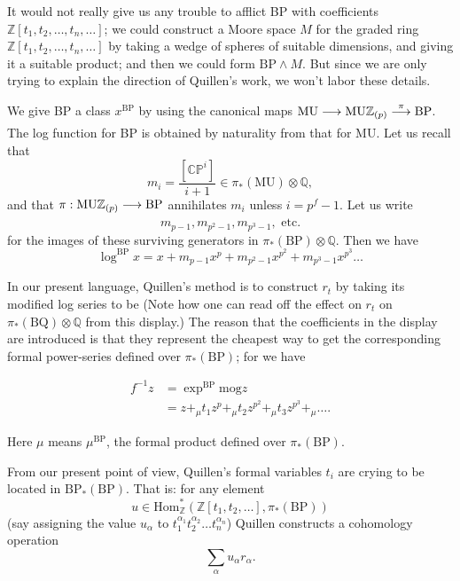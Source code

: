 \documentclass[../main]{subfiles}
\begin{document}
It would not really give us any trouble to afflict BP with coefficients $\mathbb Z[t_1, t_2, \ldots, t_n, \ldots]$; we could construct a Moore space $M$ for the graded ring $\mathbb Z[t_1, t_2, \ldots, t_n, \ldots]$ by taking a wedge of spheres of suitable dimensions, and giving it a suitable product; and then we could form $\mathrm{BP} \wedge M$. But since we are only trying to explain the direction of Quillen's work, we won't labor these details.

We give BP a class $x^{\mathrm{BP}}$ by using the canonical maps $\mathrm{MU} \lar{} \mathrm{MU} \mathbb Z_{(p)} \lar{\pi} \mathrm{BP}$. The log function for BP is obtained by naturality from that for MU. Let us recall that \[m_i = \frac {[\mathbb {CP}^i]} {i + 1} \in \pi_\ast(\mathrm{MU}) \otimes \mathbb Q,\] and that $\pi : \mathrm{MU} \mathbb Z_{(p)} \lar{} \mathrm{BP}$ annihilates $m_i$ unless $i = p^f - 1$. Let us write \[m_{p - 1}, m_{p^2 - 1}, m_{p^3 - 1}, \text { etc.}\] for the images of these surviving generators in $\pi_\ast(\mathrm{BP}) \otimes \mathbb Q$. Then we have \[\log^{\mathrm{BP}} x = x + m_{p - 1} x^p + m_{p^2 - 1} x^{p^2} + m_{p^3 - 1} x^{p^3} \ldots\] 

In our present language, Quillen's method is to construct $r_t$ by taking its modified log series to be 
(Note how one can read off the effect on $r_t$ on $\pi_\ast(\mathrm{BQ}) \otimes \mathbb Q$ from this display.) The reason that the coefficients in the display are introduced is that they represent the cheapest way to get the corresponding formal power-series defined over $\pi_\ast(\mathrm{BP})$; for we have 

\begin{align*}
f^{-1} z & = \exp^{\mathrm{BP}} \mathrm{mog} z \\ & = z +_\mu t_1 z^{p} +_\mu t_2 z^{p^2} +_\mu t_3 z^{p^3} +_\mu \ldots.
\end{align*}

Here $\mu$ means $\mu^{\mathrm{BP}}$, the formal product defined over $\pi_\ast(\mathrm{BP})$.

From our present point of view, Quillen's formal variables $t_i$ are crying to be located in $\mathrm{BP}_\ast(\mathrm{BP})$. That is: for any element \[u \in \mathrm{Hom}_{\mathbb Z}^\ast(\mathbb Z[t_1, t_2, \ldots], \pi_\ast(\mathrm {BP}))\] (say assigning the value $u_\alpha$ to $t_1^{\alpha_1} t_2^{\alpha_2} \ldots t_n^{\alpha_n}$) Quillen constructs a cohomology operation \[\sum_\alpha u_\alpha r_\alpha.\] 
\end{document}
